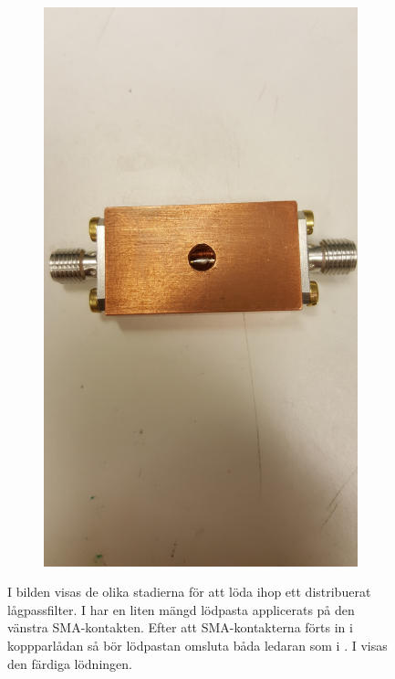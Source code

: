 \documentclass[main.tex]{subfiles}
\begin{document}
\begin{figure}[h]
\begin{subfigure}{0.329\textwidth}
        \includegraphics[angle=-90,trim=1200 100 1800 100,clip,width=0.97\linewidth]{figure/Filterbilder/filter_post_solder.jpg} 
        \caption{}
        \label{fig:post_solder}
    \end{subfigure}
    
 \caption{I bilden visas de olika stadierna för att löda ihop ett distribuerat lågpassfilter. I \protect{} har en liten mängd lödpasta applicerats på den vänstra SMA-kontakten. Efter att SMA-kontakterna förts in i koppparlådan så bör lödpastan omsluta båda ledaran som i . I  visas den färdiga lödningen.}
 \label{fig:filter_soldering}
\end{figure}
\end{document}
